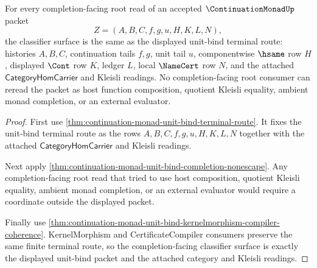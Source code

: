\begin{theorem}
\label{thm:continuationmonad-root-bind-completion-classifier}
For every completion-facing root read of an accepted $\ContinuationMonadUp$
packet
$$
Z=(A,B,C,f,g,u,H,K,L,N),
$$
the classifier surface is the same as the displayed unit-bind terminal route:
histories $A,B,C$, continuation tails $f,g$, unit tail $u$, componentwise
$\hsame$ row $H$, displayed $\Cont$ row $K$, ledger $L$, local $\NameCert$
row $N$, and the attached $\mathsf{CategoryHomCarrier}$ and Kleisli readings.
No completion-facing root consumer can reread the packet as host function
composition, quotient Kleisli equality, ambient monad completion, or an
external evaluator.
\end{theorem}
\begin{proof}
First use \autoref{thm:continuation-monad-unit-bind-terminal-route}. It fixes
the unit-bind terminal route as the rows $A,B,C,f,g,u,H,K,L,N$ together with
the attached $\mathsf{CategoryHomCarrier}$ and Kleisli readings.

Next apply \autoref{thm:continuation-monad-unit-bind-completion-nonescape}.
Any completion-facing root read that tried to use host composition, quotient
Kleisli equality, ambient monad completion, or an external evaluator would
require a coordinate outside the displayed packet.

Finally use
\autoref{thm:continuation-monad-unit-bind-kernelmorphism-compiler-coherence}.
KernelMorphism and CertificateCompiler consumers preserve the same finite
terminal route, so the completion-facing classifier surface is exactly the
displayed unit-bind packet and the attached category and Kleisli readings.
\end{proof}
